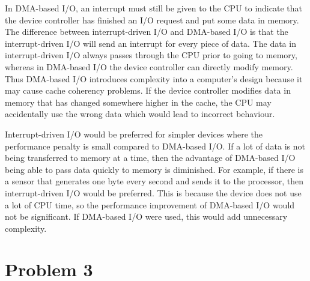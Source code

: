 \documentclass[12pt]{article}
\begin{document}
In DMA-based I/O, an interrupt must still be given to the CPU to indicate that the device controller has finished an I/O request and put some data in memory.
The difference between interrupt-driven I/O and DMA-based I/O is that the interrupt-driven I/O will send an interrupt for every piece of data. The data in
interrupt-driven I/O always passes through the CPU prior to going to memory, whereas in DMA-based I/O the device controller can directly modify memory.
Thus DMA-based I/O introduces complexity into a computer's design because it may cause cache coherency problems. If the device controller modifies data in memory
that has changed somewhere higher in the cache, the CPU may accidentally use the wrong data which would lead to incorrect behaviour.

Interrupt-driven I/O would be preferred for simpler devices where the performance penalty is small compared to DMA-based I/O. If a lot of data is not being transferred
to memory at a time, then the advantage of DMA-based I/O being able to pass data quickly to memory is diminished. For example, if there is a sensor that generates one byte
every second and sends it to the processor, then interrupt-driven I/O would be preferred. This is because the device does not use a lot of CPU time, so the performance improvement
of DMA-based I/O would not be significant. If DMA-based I/O were used, this would add unnecessary complexity.

\pagebreak

\section*{Problem 3}
\end{document}
